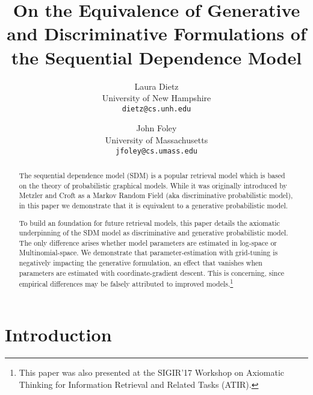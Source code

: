 \documentclass[]{article}
\title{On the Equivalence of Generative and Discriminative Formulations
of the Sequential Dependence Model}
\author{
  Laura Dietz\\
  University of New Hampshire\\
  \texttt{dietz@cs.unh.edu}
  \and
  John Foley\\
  University of Massachusetts \\
  \texttt{jfoley@cs.umass.edu}
}
\date{}
\begin{document}
\maketitle

\begin{abstract}

The sequential dependence model (SDM) is a popular retrieval model which
is based on the theory of probabilistic graphical models. While it
was originally introduced by Metzler and Croft as a Markov Random
Field (aka discriminative probabilistic model), in this paper we demonstrate that it is equivalent to a generative probabilistic model. 

To build an foundation for future retrieval models, this paper details the axiomatic underpinning of the SDM model as discriminative and generative probabilistic model. The only difference arises whether model parameters are estimated in log-space or Multinomial-space. We demonstrate that parameter-estimation with grid-tuning is negatively impacting the generative formulation, an effect that vanishes when parameters are estimated with coordinate-gradient descent. This is concerning, since empirical differences may be falsely attributed to improved models.\footnote{This paper was also presented at the SIGIR'17 Workshop on Axiomatic Thinking for Information Retrieval and Related Tasks (ATIR).}

%
\end{abstract}



\section{Introduction}
\end{document}
